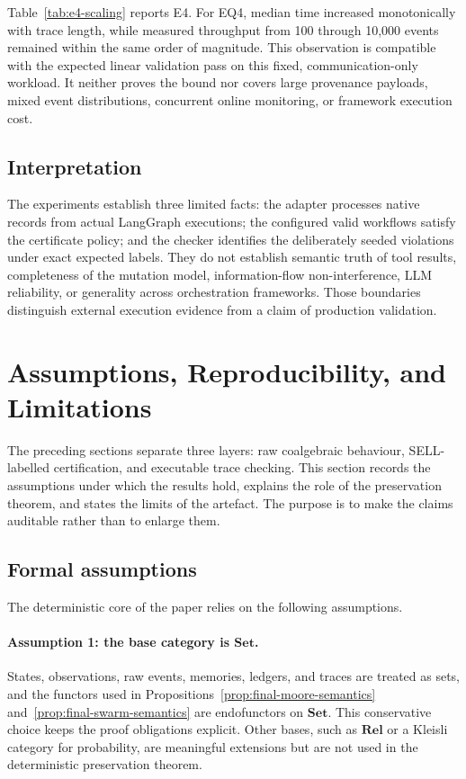 \documentclass[a4paper,fleqn]{cas-sc}
\newcommand{\Set}{\mathbf{Set}}
\begin{document}


Table~\ref{tab:e4-scaling} reports E4. For EQ4, median time increased monotonically with trace length, while measured
throughput from 100 through 10,000 events remained within the same order of
magnitude. This observation is compatible with the expected linear validation
pass on this fixed, communication-only workload. It neither proves the bound
nor covers large provenance payloads, mixed event distributions, concurrent
online monitoring, or framework execution cost.

\subsection{Interpretation}

The experiments establish three limited facts: the adapter processes native
records from actual LangGraph executions; the configured valid workflows
satisfy the certificate policy; and the checker identifies the deliberately
seeded violations under exact expected labels. They do not establish semantic
truth of tool results, completeness of the mutation model, information-flow
non-interference, LLM reliability, or generality across orchestration
frameworks. Those boundaries distinguish external execution evidence from a
claim of production validation.

\section{Assumptions, Reproducibility, and Limitations}\label{sec:reproducibility}

The preceding sections separate three layers: raw coalgebraic behaviour, SELL-labelled certification, and executable trace checking. This section records the assumptions under which the results hold, explains the role of the preservation theorem, and states the limits of the artefact. The purpose is to make the claims auditable rather than to enlarge them.

\subsection{Formal assumptions}

The deterministic core of the paper relies on the following assumptions.

\paragraph{Assumption 1: the base category is \(\Set\).}
States, observations, raw events, memories, ledgers, and traces are treated as sets, and the functors used in Propositions~\ref{prop:final-moore-semantics} and~\ref{prop:final-swarm-semantics} are endofunctors on \(\Set\). This conservative choice keeps the proof obligations explicit. Other bases, such as \(\mathbf{Rel}\) or a Kleisli category for probability, are meaningful extensions but are not used in the deterministic preservation theorem.
\end{document}
